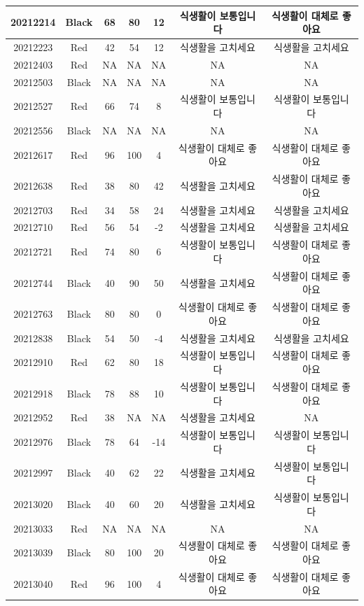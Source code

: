 \documentclass[
]{book}
\begin{document}
\begin{tabular}{c|c|c|c|c|c|c}
\hline
20212214 & Black & 68 & 80 & 12 & 식생활이 보통입니다 & 식생활이 대체로 좋아요\\
\hline
20212223 & Red & 42 & 54 & 12 & 식생활을 고치세요 & 식생활을 고치세요\\
\hline
20212403 & Red & NA & NA & NA & NA & NA\\
\hline
20212503 & Black & NA & NA & NA & NA & NA\\
\hline
20212527 & Red & 66 & 74 & 8 & 식생활이 보통입니다 & 식생활이 보통입니다\\
\hline
20212556 & Black & NA & NA & NA & NA & NA\\
\hline
20212617 & Red & 96 & 100 & 4 & 식생활이 대체로 좋아요 & 식생활이 대체로 좋아요\\
\hline
20212638 & Red & 38 & 80 & 42 & 식생활을 고치세요 & 식생활이 대체로 좋아요\\
\hline
20212703 & Red & 34 & 58 & 24 & 식생활을 고치세요 & 식생활을 고치세요\\
\hline
20212710 & Red & 56 & 54 & -2 & 식생활을 고치세요 & 식생활을 고치세요\\
\hline
20212721 & Red & 74 & 80 & 6 & 식생활이 보통입니다 & 식생활이 대체로 좋아요\\
\hline
20212744 & Black & 40 & 90 & 50 & 식생활을 고치세요 & 식생활이 대체로 좋아요\\
\hline
20212763 & Black & 80 & 80 & 0 & 식생활이 대체로 좋아요 & 식생활이 대체로 좋아요\\
\hline
20212838 & Black & 54 & 50 & -4 & 식생활을 고치세요 & 식생활을 고치세요\\
\hline
20212910 & Red & 62 & 80 & 18 & 식생활이 보통입니다 & 식생활이 대체로 좋아요\\
\hline
20212918 & Black & 78 & 88 & 10 & 식생활이 보통입니다 & 식생활이 대체로 좋아요\\
\hline
20212952 & Red & 38 & NA & NA & 식생활을 고치세요 & NA\\
\hline
20212976 & Black & 78 & 64 & -14 & 식생활이 보통입니다 & 식생활이 보통입니다\\
\hline
20212997 & Black & 40 & 62 & 22 & 식생활을 고치세요 & 식생활이 보통입니다\\
\hline
20213020 & Black & 40 & 60 & 20 & 식생활을 고치세요 & 식생활이 보통입니다\\
\hline
20213033 & Red & NA & NA & NA & NA & NA\\
\hline
20213039 & Black & 80 & 100 & 20 & 식생활이 대체로 좋아요 & 식생활이 대체로 좋아요\\
\hline
20213040 & Red & 96 & 100 & 4 & 식생활이 대체로 좋아요 & 식생활이 대체로 좋아요\\

\end{tabular}
\end{document}
